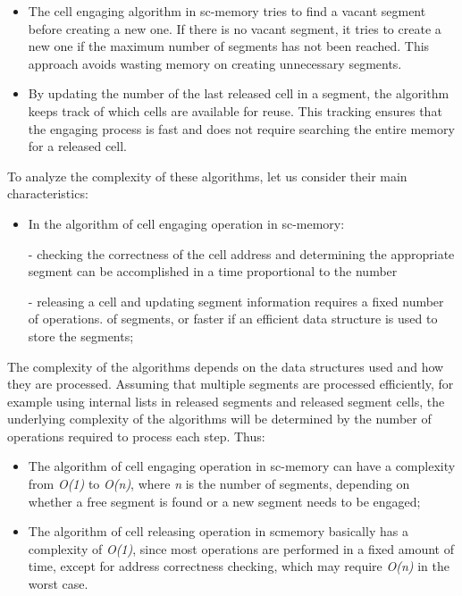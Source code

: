 \documentclass{scndocument}
\begin{document}
\begin{SCn}
\begin{multicols}{2}
\begin{itemize}
\item The cell engaging algorithm in sc-memory tries to
find a vacant segment before creating a new one. If
there is no vacant segment, it tries to create a new
one if the maximum number of segments has not
been reached. This approach avoids wasting memory
on creating unnecessary segments.
\item By updating the number of the last released cell in
a segment, the algorithm keeps track of which cells
are available for reuse. This tracking ensures that
the engaging process is fast and does not require
searching the entire memory for a released cell.
\end{itemize}
\par To analyze the complexity of these algorithms, let us
consider their main characteristics:
\begin{itemize}
\item In the algorithm of cell engaging operation in sc-memory: \item[-]checking the correctness of the cell address and
determining the appropriate segment can be accomplished in a time proportional to the number
\item[-]releasing a cell and updating segment information
requires a fixed number of operations.
of segments, or faster if an efficient data structure
is used to store the segments; \par
\end{itemize}
\par The complexity of the algorithms depends on the
data structures used and how they are processed. Assuming that multiple segments are processed efficiently,
for example using internal lists in released segments
and released segment cells, the underlying complexity
of the algorithms will be determined by the number of
operations required to process each step. Thus:
\begin{itemize}
\item The algorithm of cell engaging operation in sc-memory can have a complexity from \textit{O(1)}   to \textit{O(n)},
where \textit{n} is the number of segments, depending on
whether a free segment is found or a new segment
needs to be engaged;
\item The algorithm of cell releasing operation in scmemory basically has a complexity of \textit{O(1)}, since
most operations are performed in a fixed amount of
time, except for address correctness checking, which
may require \textit{O(n)} in the worst case.

\end{itemize}
\end{multicols}
\end{SCn}
\end{document}
